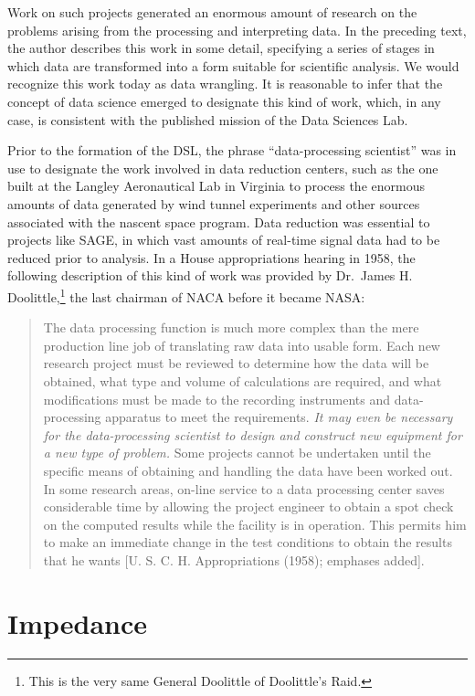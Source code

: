 \documentclass[
  letterpaper,
]{report}
\begin{document}
Work on such projects generated an enormous amount of research on the
problems arising from the processing and interpreting data. In the
preceding text, the author describes this work in some detail,
specifying a series of stages in which data are transformed into a form
suitable for scientific analysis. We would recognize this work today as
data wrangling. It is reasonable to infer that the concept of data
science emerged to designate this kind of work, which, in any case, is
consistent with the published mission of the Data Sciences Lab.

Prior to the formation of the DSL, the phrase ``data-processing
scientist'' was in use to designate the work involved in data reduction
centers, such as the one built at the Langley Aeronautical Lab in
Virginia to process the enormous amounts of data generated by wind
tunnel experiments and other sources associated with the nascent space
program. Data reduction was essential to projects like SAGE, in which
vast amounts of real-time signal data had to be reduced prior to
analysis. In a House appropriations hearing in 1958, the following
description of this kind of work was provided by Dr.~James H.
Doolittle,\footnote{This is the very same General Doolittle of
  Doolittle's Raid.} the last chairman of NACA before it became NASA:

\begin{quote}
The data processing function is much more complex than the mere
production line job of translating raw data into usable form. Each new
research project must be reviewed to determine how the data will be
obtained, what type and volume of calculations are required, and what
modifications must be made to the recording instruments and
data-processing apparatus to meet the requirements. \emph{It may even be
necessary for the data-processing scientist to design and construct new
equipment for a new type of problem.} Some projects cannot be undertaken
until the specific means of obtaining and handling the data have been
worked out. In some research areas, on-line service to a data processing
center saves considerable time by allowing the project engineer to
obtain a spot check on the computed results while the facility is in
operation. This permits him to make an immediate change in the test
conditions to obtain the results that he wants {[}U. S. C. H.
Appropriations (1958); emphases added{]}.
\end{quote}

\hypertarget{impedance}{%
\section{Impedance}\label{impedance}}
\end{document}
